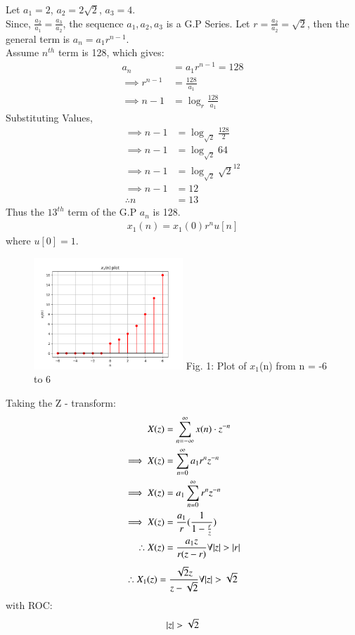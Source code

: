 \documentclass[journal,12pt,twocolumn]{IEEEtran}
\theoremstyle{remark}
\begin{document}
Let $a_1 = 2$, $a_2 = 2\sqrt{2}$, $a_3 = 4$.\\
Since, $\frac{a_2}{a_1} = \frac{a_3}{a_2}$, the sequence $a_1, a_2, a_3$ is a G.P Series.
Let $r = \frac{a_2}{a_2} = \sqrt{2}$, then the general term is $a_n = a_1 r^{n-1}$.\\
Assume $n^{th}$ term is 128, which gives: 
\begin{align}
    a_n &= a_1 r^{n-1} = 128\\
    \implies r^{n-1} &= \frac{128}{a_1}\\
    \implies n - 1 &= \log_{r}{\frac{128}{a_1}}
\end{align}
Substituting Values,
\begin{align}
    \implies n - 1 &= \log_{\sqrt{2}}{\frac{128}{2}}\\
    \implies n - 1 &= \log_{\sqrt{2}}{64}\\
    \implies n - 1 &= \log_{\sqrt{2}}{\sqrt{2}^{12}}\\
    \implies n - 1 &= 12\\
    \therefore n &= 13
\end{align}
Thus the $13^{th}$ term of the G.P $a_n$ is 128.\\ 
\begin{align} x_1(n) = x_1(0)r^{n}u[n] \end{align} where $u[0] = 1$.
\begin{figure}[h!]
    \centering
    \includegraphics[width=0.5\textwidth]{figs/a.png}
    Fig. 1: Plot of $x_1$(n) from n = -6 to 6
    \label{fig:img1}
\end{figure}
Taking the Z - transform:
\begin{align}
    X(z) &= \sum_{n = -\infty}^{\infty}{x(n) \cdot z^{-n}}\\
    \implies X(z) &= \sum_{n = 0}^{\infty}{a_1r^{n}z^{-n}}\\
    \implies X(z) &= a_1\sum_{n = 0}^{\infty}{r^n z^{-n}}\\
    \implies X(z) &= \frac{a_1}{r}(\frac{1}{1 - \frac{r}{z}})\\
    \therefore X(z) &= \frac{a_1z}{r(z - r)} \forall {\left\vert z\right\vert > \left\vert r\right\vert} \label{zresult}
\end{align}
\begin{align}
    \therefore X_1(z) = \frac{\sqrt{2}z}{z - \sqrt{2}}\forall {\left\vert z\right\vert > \sqrt{2}}
\end{align}
with ROC: \[ \left\vert z\right\vert > \sqrt{2} \]
\end{document}
